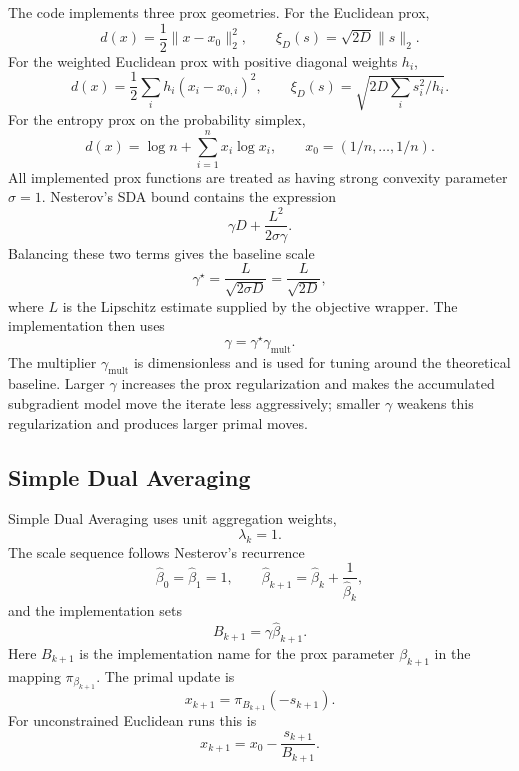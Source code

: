 \documentclass[11pt]{article}
\begin{document}
The code implements three prox geometries.  For the Euclidean prox,
\[
    d(x)=\frac12\|x-x_0\|_2^2,
    \qquad
    \xi_D(s)=\sqrt{2D}\|s\|_2.
\]
For the weighted Euclidean prox with positive diagonal weights \(h_i\),
\[
    d(x)=\frac12\sum_i h_i(x_i-x_{0,i})^2,
    \qquad
    \xi_D(s)=\sqrt{2D\sum_i s_i^2/h_i}.
\]
For the entropy prox on the probability simplex,
\[
    d(x)=\log n+\sum_{i=1}^n x_i\log x_i,
    \qquad
    x_0=(1/n,\ldots,1/n).
\]
All implemented prox functions are treated as having strong convexity parameter
\(\sigma=1\).  Nesterov's SDA bound contains the expression
\[
    \gamma D+\frac{L^2}{2\sigma\gamma}.
\]
Balancing these two terms gives the baseline scale
\[
    \gamma^\star=\frac{L}{\sqrt{2\sigma D}}=\frac{L}{\sqrt{2D}},
\]
where \(L\) is the Lipschitz estimate supplied by the objective wrapper.  The
implementation then uses
\[
    \gamma=\gamma^\star\gamma_{\mathrm{mult}}.
\]
The multiplier \(\gamma_{\mathrm{mult}}\) is dimensionless and is used for
tuning around the theoretical baseline.  Larger \(\gamma\) increases the prox
regularization and makes the accumulated subgradient model move the iterate
less aggressively; smaller \(\gamma\) weakens this regularization and produces
larger primal moves.

\subsection{Simple Dual Averaging}

Simple Dual Averaging uses unit aggregation weights,
\[
    \lambda_k=1.
\]
The scale sequence follows Nesterov's recurrence
\[
    \hat\beta_0=\hat\beta_1=1,
    \qquad
    \hat\beta_{k+1}=\hat\beta_k+\frac{1}{\hat\beta_k},
\]
and the implementation sets
\[
    B_{k+1}=\gamma\hat\beta_{k+1}.
\]
Here \(B_{k+1}\) is the implementation name for the prox parameter
\(\beta_{k+1}\) in the mapping \(\pi_{\beta_{k+1}}\).
The primal update is
\[
    x_{k+1}=\pi_{B_{k+1}}(-s_{k+1}).
\]
For unconstrained Euclidean runs this is
\[
    x_{k+1}=x_0-\frac{s_{k+1}}{B_{k+1}}.
\]
\end{document}
